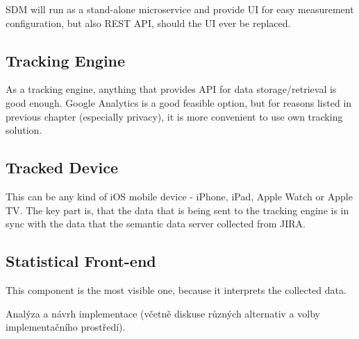 SDM will run as a stand-alone microservice and provide UI for easy measurement configuration, but also REST API, should the UI ever be replaced.


\subsection{Tracking Engine}

As a tracking engine, anything that provides API for data storage/retrieval is good enough. Google Analytics is a good feasible option, but for reasons listed in previous chapter (especially privacy), it is more convenient to use own tracking solution.


\subsection{Tracked Device}

This can be any kind of iOS mobile device - iPhone, iPad, Apple Watch or Apple TV. The key part is, that the data that is being sent to the tracking engine is in sync with the data that the semantic data server collected from JIRA.


\subsection{Statistical Front-end}

This component is the most visible one, because it interprets the collected data.


Analýza a návrh implementace (včetně diskuse různých alternativ a volby implementačního prostředí).